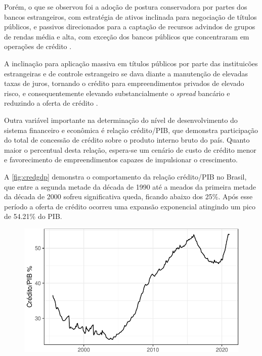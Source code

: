 \documentclass[12pt,12pt,openright,oneside,a4paper,chapter=TITLE,section=TITLE,subsection=TITLE,subsubsection=TITLE,english,french,spanish,portugues,sumario=tradicional]{abntex2}
\begin{document}
Porém, o que se observou foi a adoção de postura conservadora por partes dos
bancos estrangeiros, com estratégia de ativos inclinada para negociação de
títulos públicos, e passivos direcionados para a captação de recursos advindos
de grupos de rendas média e alta, com exceção dos bancos públicos que
concentraram em operações de crédito \cite{camargo:2009}.

A inclinação para aplicação massiva em títulos públicos por parte das instituicões estrangeiras e de controle estrangeiro se dava diante a manutenção de elevadas taxas de juros, tornando o crédito para empreendimentos privados de elevado risco, e consequentemente elevando substancialmente o \emph{spread} bancário e reduzindo a oferta de crédito \cite{camargo:2009}.

Outra variável importante na determinação do nível de desenvolvimento do sistema financeiro e econômica é relação crédito/PIB, que demonstra participação do total de concessão de crédito sobre o produto interno bruto do país. Quanto maior o percentual desta relação, espera-se um cenário de custo de crédito menor e favorecimento de empreendimentos capazes de impulsionar o crescimento.

A \autoref{fig:credgdp} demonstra o comportamento da relação crédito/PIB no Brasil, que entre a segunda metade da década de 1990 até a meados da primeira metade da década de 2000 sofreu significativa queda, ficando abaixo dos 25\%. Após esse período a oferta de crédito ocorreu uma expansão exponencial atingindo um pico de 54.21\% do PIB.

\begin{figure}

\begin{center}\includegraphics{12-exportedfigures/credit gdp-1} \end{center}
\label{fig:credgdp}
\end{figure}
\end{document}
